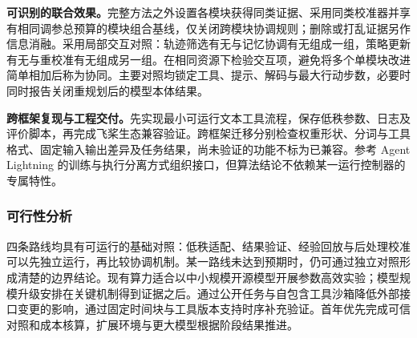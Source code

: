 \textbf{可识别的联合效果。}完整方法之外设置各模块获得同类证据、采用同类校准器并享有相同调参总预算的模块组合基线，仅关闭跨模块协调规则；删除或打乱证据另作信息消融。采用局部交互对照：轨迹筛选有无与记忆协调有无组成一组，策略更新有无与重校准有无组成另一组。在相同资源下检验交互项，避免将多个单模块改进简单相加后称为协同。主要对照均锁定工具、提示、解码与最大行动步数，必要时同时报告关闭重规划后的模型本体结果。

\textbf{跨框架复现与工程交付。}先实现最小可运行文本工具流程，保存低秩参数、日志及评价脚本，再完成飞桨生态兼容验证。跨框架迁移分别检查权重形状、分词与工具格式、固定输入输出差异及任务结果，尚未验证的功能不标为已兼容。参考 Agent Lightning 的训练与执行分离方式组织接口，但算法结论不依赖某一运行控制器的专属特性\cite{lightning,lightningv1}。

\subsubsection{可行性分析}

四条路线均具有可运行的基础对照：低秩适配、结果验证、经验回放与后处理校准可以先独立运行，再比较协调机制。某一路线未达到预期时，仍可通过独立对照形成清楚的边界结论。现有算力适合以中小规模开源模型开展参数高效实验；模型规模升级安排在关键机制得到证据之后。通过公开任务与自包含工具沙箱降低外部接口变更的影响，通过固定时间块与工具版本支持时序补充验证。首年优先完成可信对照和成本核算，扩展环境与更大模型根据阶段结果推进。
